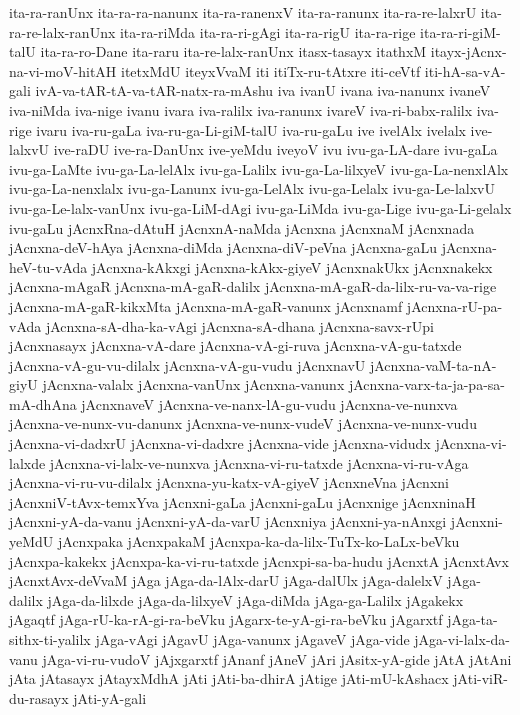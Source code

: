 {ita-ra-ranUnx
ita-ra-ra-nanunx
ita-ra-ranenxV
ita-ra-ranunx
ita-ra-re-lalxrU
ita-ra-re-lalx-ranUnx
ita-ra-riMda
ita-ra-ri-gAgi
ita-ra-rigU
ita-ra-rige
ita-ra-ri-giM-talU
ita-ra-ro-Dane
ita-raru
ita-re-lalx-ranUnx
itasx-tasayx
itathxM
itayx-jAcnx-na-vi-moV-hitAH
itetxMdU
iteyxVvaM
iti
itiTx-ru-tAtxre
iti-ceVtf
iti-hA-sa-vA-gali
ivA-va-tAR-tA-va-tAR-natx-ra-mAshu
iva
ivanU
ivana
iva-nanunx
ivaneV
iva-niMda
iva-nige
ivanu
ivara
iva-ralilx
iva-ranunx
ivareV
iva-ri-babx-ralilx
iva-rige
ivaru
iva-ru-gaLa
iva-ru-ga-Li-giM-talU
iva-ru-gaLu
ive
ivelAlx
ivelalx
ive-lalxvU
ive-raDU
ive-ra-DanUnx
ive-yeMdu
iveyoV
ivu
ivu-ga-LA-dare
ivu-gaLa
ivu-ga-LaMte
ivu-ga-La-lelAlx
ivu-ga-Lalilx
ivu-ga-La-lilxyeV
ivu-ga-La-nenxlAlx
ivu-ga-La-nenxlalx
ivu-ga-Lanunx
ivu-ga-LelAlx
ivu-ga-Lelalx
ivu-ga-Le-lalxvU
ivu-ga-Le-lalx-vanUnx
ivu-ga-LiM-dAgi
ivu-ga-LiMda
ivu-ga-Lige
ivu-ga-Li-gelalx
ivu-gaLu
jAcnxRna-dAtuH
jAcnxnA-naMda
jAcnxna
jAcnxnaM
jAcnxnada
jAcnxna-deV-hAya
jAcnxna-diMda
jAcnxna-diV-peVna
jAcnxna-gaLu
jAcnxna-heV-tu-vAda
jAcnxna-kAkxgi
jAcnxna-kAkx-giyeV
jAcnxnakUkx
jAcnxnakekx
jAcnxna-mAgaR
jAcnxna-mA-gaR-dalilx
jAcnxna-mA-gaR-da-lilx-ru-va-va-rige
jAcnxna-mA-gaR-kikxMta
jAcnxna-mA-gaR-vanunx
jAcnxnamf
jAcnxna-rU-pa-vAda
jAcnxna-sA-dha-ka-vAgi
jAcnxna-sA-dhana
jAcnxna-savx-rUpi
jAcnxnasayx
jAcnxna-vA-dare
jAcnxna-vA-gi-ruva
jAcnxna-vA-gu-tatxde
jAcnxna-vA-gu-vu-dilalx
jAcnxna-vA-gu-vudu
jAcnxnavU
jAcnxna-vaM-ta-nA-giyU
jAcnxna-valalx
jAcnxna-vanUnx
jAcnxna-vanunx
jAcnxna-varx-ta-ja-pa-sa-mA-dhAna
jAcnxnaveV
jAcnxna-ve-nanx-lA-gu-vudu
jAcnxna-ve-nunxva
jAcnxna-ve-nunx-vu-danunx
jAcnxna-ve-nunx-vudeV
jAcnxna-ve-nunx-vudu
jAcnxna-vi-dadxrU
jAcnxna-vi-dadxre
jAcnxna-vide
jAcnxna-vidudx
jAcnxna-vi-lalxde
jAcnxna-vi-lalx-ve-nunxva
jAcnxna-vi-ru-tatxde
jAcnxna-vi-ru-vAga
jAcnxna-vi-ru-vu-dilalx
jAcnxna-yu-katx-vA-giyeV
jAcnxneVna
jAcnxni
jAcnxniV-tAvx-temxYva
jAcnxni-gaLa
jAcnxni-gaLu
jAcnxnige
jAcnxninaH
jAcnxni-yA-da-vanu
jAcnxni-yA-da-varU
jAcnxniya
jAcnxni-ya-nAnxgi
jAcnxni-yeMdU
jAcnxpaka
jAcnxpakaM
jAcnxpa-ka-da-lilx-TuTx-ko-LaLx-beVku
jAcnxpa-kakekx
jAcnxpa-ka-vi-ru-tatxde
jAcnxpi-sa-ba-hudu
jAcnxtA
jAcnxtAvx
jAcnxtAvx-deVvaM
jAga
jAga-da-lAlx-darU
jAga-dalUlx
jAga-dalelxV
jAga-dalilx
jAga-da-lilxde
jAga-da-lilxyeV
jAga-diMda
jAga-ga-Lalilx
jAgakekx
jAgaqtf
jAga-rU-ka-rA-gi-ra-beVku
jAgarx-te-yA-gi-ra-beVku
jAgarxtf
jAga-ta-sithx-ti-yalilx
jAga-vAgi
jAgavU
jAga-vanunx
jAgaveV
jAga-vide
jAga-vi-lalx-da-vanu
jAga-vi-ru-vudoV
jAjxgarxtf
jAnanf
jAneV
jAri
jAsitx-yA-gide
jAtA
jAtAni
jAta
jAtasayx
jAtayxMdhA
jAti
jAti-ba-dhirA
jAtige
jAti-mU-kAshacx
jAti-viR-du-rasayx
jAti-yA-gali
}

